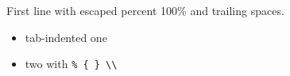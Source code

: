 \documentclass{article}
\begin{document}
First line with escaped percent 100\% and trailing spaces.  

\begin{itemize}
	\item tab-indented one
	\item two with \verb|% { } \\|
\end{itemize}
\end{document}
